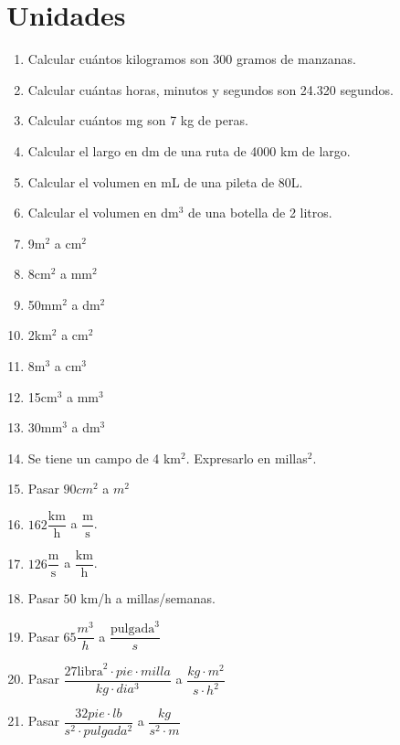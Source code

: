 \section{Unidades}

\begin{enumerate}
\item Calcular cuántos kilogramos son  300 gramos de manzanas.

\item Calcular cuántas horas, minutos y segundos son 24.320 segundos.

\item Calcular cuántos mg son 7 kg de peras.

\item Calcular el largo en dm de una ruta de 4000 km de largo.

\item Calcular el volumen en mL de una pileta de 80L.

\item Calcular el volumen en dm$^3$ de una botella de 2 litros.

\item 9m$^2$ a cm$^2$

\item 8cm$^2$ a mm$^2$

\item 50mm$^2$ a dm$^2$

\item 2km$^2$ a cm$^2$

\item 8m$^3$ a cm$^3$

\item 15cm$^3$ a mm$^3$

\item 30mm$^3$ a dm$^3$

\item Se tiene un campo de 4 km$^2$. Expresarlo en millas$^2$.

\item Pasar $90 cm^2$ a $m^2$

\item $162 \dfrac{\text{km}}{\text{h}}$ a $\dfrac{\text{m}}{\text{s}}$.

\item $126 \dfrac{\text{m}}{\text{s}}$ a $\dfrac{\text{km}}{\text{h}}$.

\item Pasar  $50$ km/h a millas/semanas.

\item Pasar $65 \dfrac{m^3}{h}$ a $\dfrac{\text{pulgada}^3}{s}$


\item Pasar 
$\dfrac{27\text{libra}^2 \cdot pie \cdot milla}{kg \cdot dia^3}$
a
$\dfrac{kg \cdot m^2}{s\cdot h^2}$


\item Pasar $\dfrac{32 pie \cdot lb}{s^2 \cdot pulgada^2}$ a  $\dfrac{kg}{s^2 \cdot m}$

\end{enumerate}
